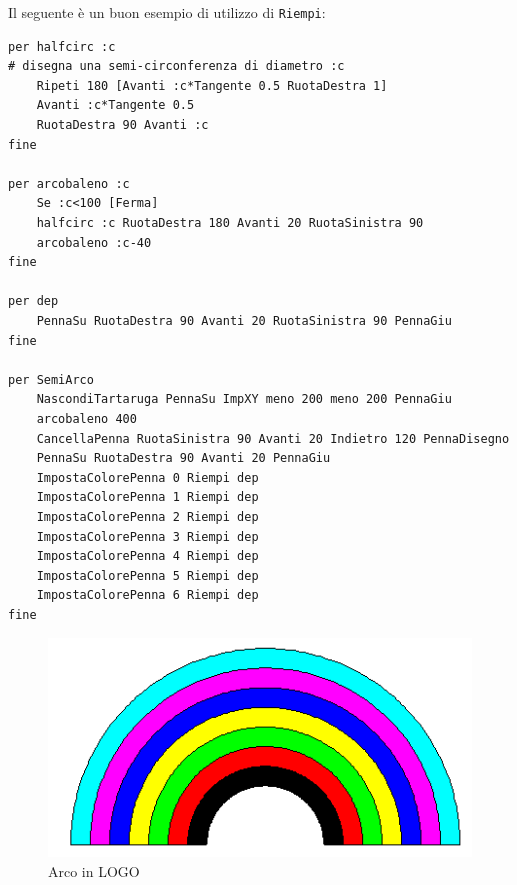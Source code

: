 Il seguente è un buon esempio di utilizzo di \texttt{Riempi}:

\begin{lstlisting}[caption="Disegniamo e coloriamo un arcobaleno"]
per halfcirc :c 
# disegna una semi-circonferenza di diametro :c
	Ripeti 180 [Avanti :c*Tangente 0.5 RuotaDestra 1] 
	Avanti :c*Tangente 0.5 
	RuotaDestra 90 Avanti :c 
fine 

per arcobaleno :c 
	Se :c<100 [Ferma] 
	halfcirc :c RuotaDestra 180 Avanti 20 RuotaSinistra 90 
	arcobaleno :c-40 
fine

per dep 
	PennaSu RuotaDestra 90 Avanti 20 RuotaSinistra 90 PennaGiu 
fine 

per SemiArco 
	NascondiTartaruga PennaSu ImpXY meno 200 meno 200 PennaGiu
	arcobaleno 400 
	CancellaPenna RuotaSinistra 90 Avanti 20 Indietro 120 PennaDisegno 
	PennaSu RuotaDestra 90 Avanti 20 PennaGiu 
	ImpostaColorePenna 0 Riempi dep 
	ImpostaColorePenna 1 Riempi dep 
	ImpostaColorePenna 2 Riempi dep 
	ImpostaColorePenna 3 Riempi dep 
	ImpostaColorePenna 4 Riempi dep 
	ImpostaColorePenna 5 Riempi dep 
	ImpostaColorePenna 6 Riempi dep 
fine
\end{lstlisting}
\pagebreak

%
\begin{figure}
	\includegraphics*{pics/arc.png}
	\caption{Arco in LOGO}
\end{figure}



